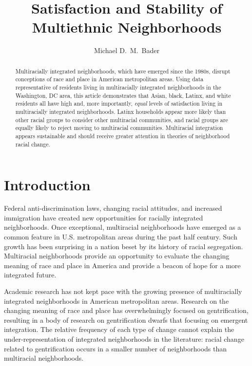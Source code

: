 \documentclass{baderart}
\title{Satisfaction and Stability of Multiethnic Neighborhoods}
\author{Michael D.\ M.\ Bader}
\begin{document}
\maketitle

\begin{abstract}
Multiracially integrated neighborhoods, which have emerged since the 1980s, disrupt conceptions of race and place in American metropolitan areas. Using data representative of residents living in multiracially integrated neighborhoods in the Washington, DC area, this article demonstrates that Asian, black, Latinx, and white residents all have high and, more importantly, \emph{equal} levels of satisfaction living in multiracially integrated neighborhoods. Latinx households appear more likely than other racial groups to consider other multiracial communities, and racial groups are equally likely to reject moving to multiracial communities. Multiracial integration appears sustainable and should receive greater attention in theories of neighborhood racial change. 
\end{abstract}

\doublespace

\section{Introduction}\label{introduction}
Federal anti-discrimination laws, changing racial attitudes, and increased immigration have created new opportunities for racially integrated neighborhoods. Once exceptional, multiracial neighborhoods have emerged as a common feature in U.S. metropolitan areas during the past half century. Such growth has been surprising in a nation beset by its history of racial segregation. Multiracial neighborhoods provide an opportunity to evaluate the changing meaning of race and place in America and provide a beacon of hope for a more integrated future.

Academic research has not kept pace with the growing presence of multiracially integrated neighborhoods in American metropolitan areas. Research on the changing meaning of race and place has overwhelmingly focused on gentrification, resulting in a body of research on gentrification dwarfs that focusing on emergent integration. The relative frequency of each type of change cannot explain the under-representation of integrated neighborhoods in the literature: racial change related to gentrification occurs in a smaller number of neighborhoods than multiracial neighborhoods. 
\end{document}
